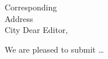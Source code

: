 \address{
  Editor\\Address\\City}{
  Corresponding\\Address\\City}
Dear Editor,
\par
We are pleased to submit \dots
